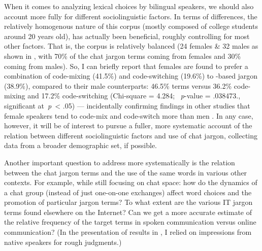 \documentclass[output=paper
,newtxmath
,modfonts
,nonflat]{langsci/langscibook}
\begin{document}
When it comes to analyzing lexical choices by bilingual speakers, we should also account more fully for different sociolinguistic factors. In terms of  differences, the relatively homogenous nature of this corpus (mostly composed of college students around 20 years old), has actually been beneficial, roughly controlling for most other factors. That is, the corpus is relatively balanced (24 females \& 32 males as shown in , with 70\% of the chat jargon terms coming from females and 30\% coming from males). So, I can briefly report that females are found to prefer a combination of code-mixing (41.5\%) and code-switching (19.6\%) to -based jargon (38.9\%), compared to their male counterparts: 46.5\%  terms versus 36.2\%  code-mixing and 17.2\% code-switching (Chi-square = 4.284; ~\textit{p}{}-value = .038473., significant at~\textit{p}~< .05) — incidentally confirming findings in other studies that female speakers tend to code-mix and code-switch more than men \citep{ahmeh2015,hamdani2012,wong2006}. In any case, however, it will be of interest to pursue a fuller, more systematic account of the relation between different sociolinguistic factors and use of chat jargon, collecting data from a broader demographic set, if possible. 

Another important question to address more systematically is the relation between the chat jargon terms and the use of the same words in various other contexts. For example, while still focusing on chat space: how do the dynamics of a chat group (instead of just one-on-one exchanges) affect word choices and the promotion of particular jargon terms? To what extent are the various IT jargon terms found elsewhere on the Internet? Can we get a more accurate estimate of the relative frequency of the target terms in spoken communication versus online communication? (In the presentation of results in , I relied on impressions from native speakers for rough judgments.) 
\end{document}
